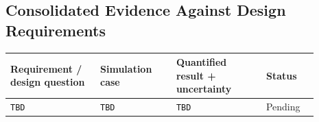 \subsection{Consolidated Evidence Against Design Requirements}\label{sec:sim-consolidated}
\begin{longtable}{p{0.26\linewidth}p{0.22\linewidth}p{0.26\linewidth}p{0.15\linewidth}}
\toprule
Requirement / design question & Simulation case & Quantified result + uncertainty & Status \\
\midrule
\endhead
\texttt{TBD} & \texttt{TBD} & \texttt{TBD} & Pending \\
\bottomrule
\end{longtable}
